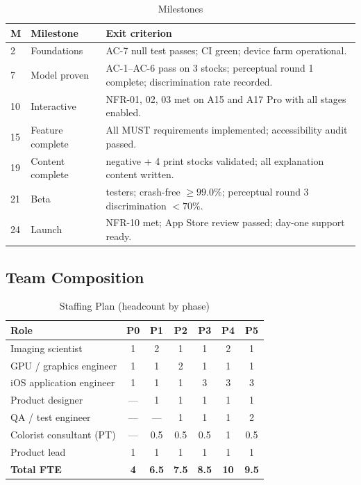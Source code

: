 \begin{table}[htbp]
\caption{Milestones}
\label{tab:milestones}
\begin{center}
\renewcommand{\arraystretch}{1.15}
\begin{tabularx}{\columnwidth}{@{}ll>{\raggedright\arraybackslash}X@{}}
\toprule
\textbf{M} & \textbf{Milestone} & \textbf{Exit criterion} \\
\midrule
2  & Foundations & AC-7 null test passes; CI green; device farm operational. \\
7  & Model proven & AC-1--AC-6 pass on 3 stocks; perceptual round 1 complete; discrimination rate recorded. \\
10 & Interactive & NFR-01, 02, 03 met on A15 and A17 Pro with all stages enabled. \\
15 & Feature complete & All MUST requirements implemented; accessibility audit passed. \\
19 & Content complete & 10 negative + 4 print stocks validated; all explanation content written. \\
21 & Beta & 500 testers; crash-free $\geq 99.0\%$; perceptual round 3 discrimination $< 70\%$. \\
24 & Launch & NFR-10 met; App Store review passed; day-one support ready. \\
\bottomrule
\end{tabularx}
\end{center}
\end{table}

\subsection{Team Composition}

\begin{table}[htbp]
\caption{Staffing Plan (headcount by phase)}
\label{tab:staffing}
\begin{center}
\renewcommand{\arraystretch}{1.15}
\begin{tabular}{@{}lcccccc@{}}
\toprule
\textbf{Role} & \textbf{P0} & \textbf{P1} & \textbf{P2} & \textbf{P3} & \textbf{P4} & \textbf{P5} \\
\midrule
Imaging scientist        & 1 & 2 & 1 & 1 & 2 & 1 \\
GPU / graphics engineer  & 1 & 1 & 2 & 1 & 1 & 1 \\
iOS application engineer & 1 & 1 & 1 & 3 & 3 & 3 \\
Product designer         & --- & 1 & 1 & 1 & 1 & 1 \\
QA / test engineer       & --- & --- & 1 & 1 & 1 & 2 \\
Colorist consultant (PT) & --- & 0.5 & 0.5 & 0.5 & 1 & 0.5 \\
Product lead             & 1 & 1 & 1 & 1 & 1 & 1 \\
\midrule
\textbf{Total FTE} & \textbf{4} & \textbf{6.5} & \textbf{7.5} & \textbf{8.5} & \textbf{10} & \textbf{9.5} \\
\bottomrule
\end{tabular}
\end{center}
\end{table}

